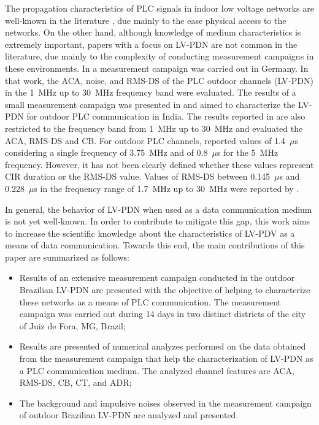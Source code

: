 \documentclass[journal]{IEEEtran}
\begin{document}
The propagation characteristics of \ac{PLC} signals in indoor low voltage networks are well-known in the literature \cite{Zimmermann2002, Tlich2008, Tlich2008a, Tonello2014}, due mainly to the ease physical access to the networks. On the other hand, although knowledge of medium characteristics is extremely important, papers with a focus on \ac{LV-PDN} are not common in the literature, due mainly to the complexity of conducting measurement campaigns in these environments. In \cite{Liu2000} a measurement campaign was carried out in Germany. In that work, the \ac{ACA}, noise, and \ac{RMS-DS} of the \ac{PLC} outdoor channels (\ac{LV-PDN}) in the 1~MHz up to 30~MHz frequency band were evaluated. The results of a small measurement campaign was presented in \cite{Prasad2001} and aimed to characterize the \ac{LV-PDN} for outdoor \ac{PLC} communication in India. The results reported in \cite{Prasad2001} are also restricted to the frequency band from 1~MHz up to 30~MHz and evaluated the \ac{ACA}, \ac{RMS-DS} and \ac{CB}. For outdoor \ac{PLC} channels, \cite{Liu2000} reported values of 1.4~$\mu$s  considering a single frequency of 3.75~MHz and of 0.8~$\mu$s for the 5~MHz frequency. However, it has not been clearly defined whether these values represent \ac{CIR} duration or the \ac{RMS-DS} value. Values of \ac{RMS-DS} between 0.145~$\mu$s and 0.228~$\mu$s in the frequency range of 1.7~MHz up to 30~MHz were reported by \cite{Prasad2001}.

In general, the behavior of \ac{LV-PDN} when used as a data communication medium is not yet well-known. In order to contribute to mitigate this gap, this work aims to increase the scientific knowledge about the characteristics of LV-PDV as a means of data communication. Towards this end, the main contributions of this paper are summarized as follows:
\begin{itemize}
	\item Results of an extensive measurement campaign conducted in the outdoor Brazilian \ac{LV-PDN} are presented with the objective of helping to characterize these networks as a means of \ac{PLC} communication. The measurement campaign was carried out during 14 days in two distinct districts of the city of Juiz de Fora, MG, Brazil;	 
	\item Results are presented of numerical analyzes performed on the data obtained from the measurement campaign that help the characterization of \ac{LV-PDN} as a \ac{PLC} communication medium.  The analyzed channel features are \ac{ACA}, \ac{RMS-DS}, \ac{CB}, \ac{CT}, and \ac{ADR};
	\item The background and impulsive noises observed in the measurement campaign of outdoor Brazilian \ac{LV-PDN} are analyzed and presented. 
\end{itemize}
\end{document}
